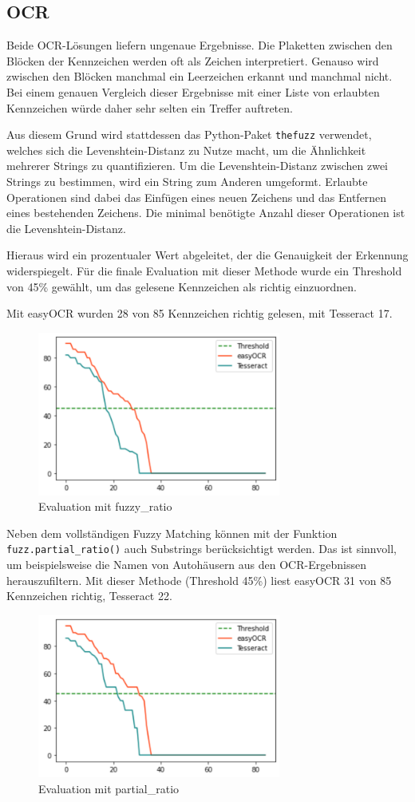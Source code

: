 \subsection{OCR}
Beide OCR-Lösungen liefern ungenaue Ergebnisse. Die Plaketten zwischen den Blöcken der Kennzeichen werden oft als Zeichen interpretiert. Genauso wird zwischen den Blöcken manchmal ein Leerzeichen erkannt und manchmal nicht.
Bei einem genauen Vergleich dieser Ergebnisse mit einer Liste von erlaubten Kennzeichen würde daher sehr selten ein Treffer auftreten.

Aus diesem Grund wird stattdessen das Python-Paket \lstinline{thefuzz} verwendet, welches sich die Levenshtein-Distanz zu Nutze macht, um die Ähnlichkeit mehrerer Strings zu quantifizieren.
Um die Levenshtein-Distanz zwischen zwei Strings zu bestimmen, wird ein String zum Anderen umgeformt. Erlaubte Operationen sind dabei das Einfügen eines neuen Zeichens und das Entfernen eines bestehenden Zeichens.
Die minimal benötigte Anzahl dieser Operationen ist die Levenshtein-Distanz.

Hieraus wird ein prozentualer Wert abgeleitet, der die Genauigkeit der Erkennung widerspiegelt.
Für die finale Evaluation mit dieser Methode wurde ein Threshold von 45\% gewählt, um das gelesene Kennzeichen als richtig einzuordnen.

Mit easyOCR wurden 28 von 85 Kennzeichen richtig gelesen, mit Tesseract 17.
\begin{figure}[h]
	\includegraphics[width=8cm]{./img/evaluation_fuzzy_ratio.svg}
	\caption{Evaluation mit fuzzy_ratio}
\end{figure}

Neben dem vollständigen Fuzzy Matching können mit der Funktion \lstinline{fuzz.partial_ratio()} auch Substrings berücksichtigt werden.
Das ist sinnvoll, um beispielsweise die Namen von Autohäusern aus den OCR-Ergebnissen herauszufiltern.
Mit dieser Methode (Threshold 45\%) liest easyOCR 31 von 85 Kennzeichen richtig, Tesseract 22.
\begin{figure}[h]
	\includegraphics[width=8cm]{./img/evaluation_partial_ratio.svg}
	\caption{Evaluation mit partial_ratio}
\end{figure}



